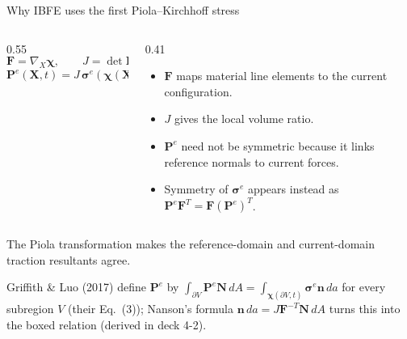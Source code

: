 \documentclass[aspectratio=169,11pt]{beamer}
\newcommand{\Xvec}{\bm{X}}
\newcommand{\Ften}{\bm{F}}
\newcommand{\Pten}{\bm{P}^{e}}
\newcommand{\estress}{\bm{\sigma}^{e}}
\newcommand{\normal}{\bm{N}}
\newcommand{\currentnormal}{\bm{n}}
\begin{document}
\begin{frame}{Why IBFE uses the first Piola--Kirchhoff stress}
\begin{columns}[c,onlytextwidth]
\begin{column}{0.55\textwidth}
\[
\Ften=\nabla_{\!X}\bm{\chi},
\qquad J=\det\Ften,
\]
\[
\boxed{\Pten(\Xvec,t)
=J\,\estress(\bm{\chi}(\Xvec,t),t)\,\Ften^{-T}}
\]
\end{column}
\begin{column}{0.41\textwidth}
\begin{itemize}\itemsep7pt
  \item \(\Ften\) maps material line elements to the current configuration.
  \item \(J\) gives the local volume ratio.
  \item \(\Pten\) need not be symmetric because it links reference normals to current forces.
  \item Symmetry of \(\estress\) appears instead as \(\Pten\Ften^{T}=\Ften(\Pten)^{T}\).
\end{itemize}
\end{column}
\end{columns}

\medskip
\begin{punchbox}
The Piola transformation makes the reference-domain and current-domain traction resultants agree.
\end{punchbox}

\vfill
{\scriptsize\color{DarkGray}Griffith \& Luo (2017) define \(\Pten\) by \(\int_{\partial V}\Pten\normal\,dA=\int_{\bm{\chi}(\partial V,t)}\estress\currentnormal\,da\) for every subregion \(V\) (their Eq.~(3)); Nanson's formula \(\currentnormal\,da=J\Ften^{-T}\normal\,dA\) turns this into the boxed relation (derived in deck 4-2).\par}
\end{frame}
\end{document}
